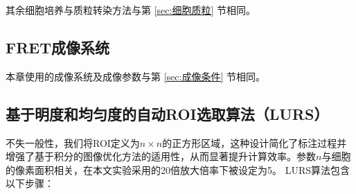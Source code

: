 其余细胞培养与质粒转染方法与第 \ref{sec:细胞质粒} 节相同。

\subsection{FRET成像系统}
本章使用的成像系统及成像参数与第 \ref{sec:成像条件} 节相同。

\subsection{基于明度和均匀度的自动ROI选取算法（LURS）}
不失一般性，我们将ROI定义为$n \times n$的正方形区域，这种设计简化了标注过程并增强了基于积分的图像优化方法的适用性，从而显著提升计算效率。参数$n$与细胞的像素面积相关，在本文实验采用的20倍放大倍率下被设定为5。
LURS算法包含以下步骤：
